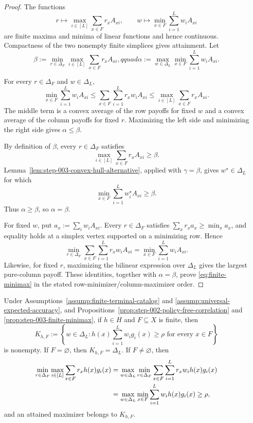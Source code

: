 \begin{proof}
The functions
\[
r\longmapsto\max_{i\in[L]}\sum_{x\in F}r_xA_{xi},
\qquad
w\longmapsto\min_{x\in F}\sum_{i=1}^Lw_iA_{xi}
\]
are finite maxima and minima of linear functions and hence continuous.
Compactness of the two nonempty finite simplices gives attainment.  Let
\[
\beta:=\min_{r\in\Delta_F}\max_{i\in[L]}
\sum_{x\in F}r_xA_{xi},qquad
\alpha:=\max_{w\in\Delta_L}\min_{x\in F}
\sum_{i=1}^Lw_iA_{xi}.
\]

For every $r\in\Delta_F$ and $w\in\Delta_L$,
\begin{equation}\label{eq:minimax-weak-duality}
\min_{x\in F}\sum_{i=1}^Lw_iA_{xi}
\le\sum_{x\in F}\sum_{i=1}^Lr_xw_iA_{xi}
\le\max_{i\in[L]}\sum_{x\in F}r_xA_{xi}.
\end{equation}
The middle term is a convex average of the row payoffs for fixed $w$ and a
convex average of the column payoffs for fixed $r$.  Maximizing the left side
and minimizing the right side gives $\alpha\le\beta$.

By definition of $\beta$, every $r\in\Delta_F$ satisfies
\[
\max_{i\in[L]}\sum_{x\in F}r_xA_{xi}\ge\beta.
\]
Lemma~\ref{lem:step-003-convex-hull-alternative}, applied with
$\gamma=\beta$, gives $w^\star\in\Delta_L$ for which
\[
\min_{x\in F}\sum_{i=1}^Lw_i^\star A_{xi}\ge\beta.
\]
Thus $\alpha\ge\beta$, so $\alpha=\beta$.

For fixed $w$, put $a_x:=\sum_iw_iA_{xi}$.  Every
$r\in\Delta_F$ satisfies $\sum_xr_xa_x\ge\min_xa_x$, and equality holds at
a simplex vertex supported on a minimizing row.  Hence
\[
\min_{r\in\Delta_F}\sum_{x\in F}\sum_{i=1}^Lr_xw_iA_{xi}
=\min_{x\in F}\sum_{i=1}^Lw_iA_{xi}.
\]
Likewise, for fixed $r$, maximizing the bilinear expression over
$\Delta_L$ gives the largest pure-column payoff.  These identities, together
with $\alpha=\beta$, prove \eqref{eq:finite-minimax} in the stated
row-minimizer/column-maximizer order.
\end{proof}

\begin{proposition}
\label{prop:step-003-finite-feasibility}
Under Assumptions~\ref{assump:finite-terminal-catalog} and
\ref{assump:universal-expected-accuracy}, and
Propositions~\ref{prop:step-002-policy-free-correlation} and
\ref{prop:step-003-finite-minimax}, if $h\in H$ and $F\subseteq X$ is
finite, then
\[
K_{h,F}:=\left\{w\in\Delta_L:
h(x)\sum_{i=1}^Lw_i g_i(x)\ge\rho
\text{ for every }x\in F\right\}
\]
is nonempty.  If $F=\varnothing$, then
$K_{h,F}=\Delta_L$.  If $F\ne\varnothing$, then
\begin{align}
\min_{r\in\Delta_F}\max_{i\in[L]}
\sum_{x\in F}r_xh(x)g_i(x)
&=\max_{w\in\Delta_L}\min_{r\in\Delta_F}
\sum_{x\in F}\sum_{i=1}^Lr_xw_i h(x)g_i(x)\notag\\
&=\max_{w\in\Delta_L}\min_{x\in F}
\sum_{i=1}^Lw_i h(x)g_i(x)
\ge\rho,
\label{eq:catalog-finite-minimax}
\end{align}
and an attained maximizer belongs to $K_{h,F}$.
\end{proposition}

